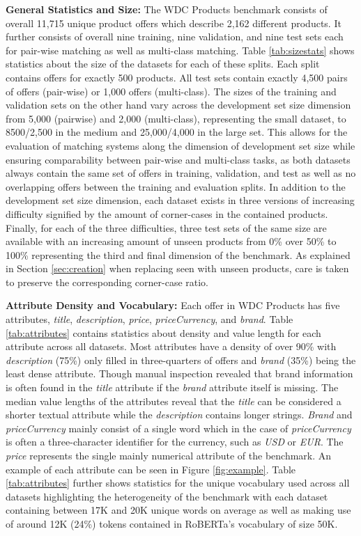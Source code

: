 \documentclass[sigconf,edbt]{acmart-edbt2024}
\begin{document}
 \textbf{General Statistics and Size:} The WDC Products benchmark consists of overall 11,715 unique product offers which describe 2,162 different products. It further consists of overall nine training, nine validation, and nine test sets each for pair-wise matching as well as multi-class matching. Table \ref{tab:sizestats} shows statistics about the size of the datasets for each of these splits. Each split contains offers for exactly 500 products. All test sets contain exactly 4,500 pairs of offers (pair-wise) or 1,000 offers (multi-class). The sizes of the training and validation sets on the other hand vary across the development set size dimension from 5,000 (pairwise) and 2,000 (multi-class), representing the small dataset, to 8500/2,500 in the medium and 25,000/4,000 in the large set. This allows for the evaluation of matching systems along the dimension of development set size while ensuring comparability between pair-wise and multi-class tasks, as both datasets always contain the same set of offers in training, validation, and test as well as no overlapping offers between the training and evaluation splits. In addition to the development set size dimension, each dataset exists in three versions of increasing difficulty signified by the amount of corner-cases in the contained products. Finally, for each of the three difficulties, three test sets of the same size are available with an increasing amount of unseen products from 0\% over 50\% to 100\% representing the third and final dimension of the benchmark. As explained in Section \ref{sec:creation} when replacing seen with unseen products, care is taken to preserve the corresponding corner-case ratio.

\textbf{Attribute Density and Vocabulary:} Each offer in WDC Products has five attributes, \textit{title}, \textit{description}, \textit{price}, \textit{priceCurrency}, and \textit{brand}. Table \ref{tab:attributes} contains statistics about density and value length for each attribute across all datasets. Most attributes have a density of over 90\% with \textit{description} (75\%) only filled in three-quarters of offers and \textit{brand} (35\%) being the least dense attribute. Though manual inspection revealed that brand information is often found in the \textit{title} attribute if the \textit{brand} attribute itself is missing. The median value lengths of the attributes reveal that the \textit{title} can be considered a shorter textual attribute while the \textit{description} contains longer strings. \textit{Brand} and \textit{priceCurrency} mainly consist of a single word which in the case of \textit{priceCurrency} is often a three-character identifier for the currency, such as \textit{USD} or \textit{EUR}. The \textit{price} represents the single mainly numerical attribute of the benchmark. An example of each attribute can be seen in Figure \ref{fig:example}. Table \ref{tab:attributes} further shows statistics for the unique vocabulary used across all datasets highlighting the heterogeneity of the benchmark with each dataset containing between 17K and 20K unique words on average as well as making use of around 12K (24\%) tokens contained in RoBERTa's vocabulary of size 50K.
\end{document}

